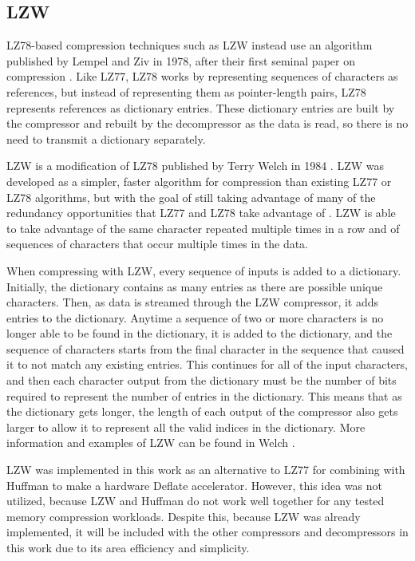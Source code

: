 \documentclass[doublespace,nopageskip]{VTthesis}
\begin{document}
\subsection{LZW}\label{ss:lzw}
LZ78-based compression techniques such as LZW instead use an algorithm published by Lempel and Ziv in 1978, after their first seminal paper on compression \cite{lz78}. Like LZ77, LZ78 works by representing sequences of characters as references, but instead of representing them as pointer-length pairs, LZ78 represents references as dictionary entries. These dictionary entries are built by the compressor and rebuilt by the decompressor as the data is read, so there is no need to transmit a dictionary separately.

LZW is a modification of LZ78 published by Terry Welch in 1984 \cite{lzw}. LZW was developed as a simpler, faster algorithm for compression than existing LZ77 or LZ78 algorithms, but with the goal of still taking advantage of many of the redundancy opportunities that LZ77 and LZ78 take advantage of \cite{lzw}. LZW is able to take advantage of the same character repeated multiple times in a row and of sequences of characters that occur multiple times in the data.

When compressing with LZW, every sequence of inputs is added to a dictionary. Initially, the dictionary contains as many entries as there are possible unique characters. Then, as data is streamed through the LZW compressor, it adds entries to the dictionary. Anytime a sequence of two or more characters is no longer able to be found in the dictionary, it is added to the dictionary, and the sequence of characters starts from the final character in the sequence that caused it to not match any existing entries. This continues for all of the input characters, and then each character output from the dictionary must be the number of bits required to represent the number of entries in the dictionary. This means that as the dictionary gets longer, the length of each output of the compressor also gets larger to allow it to represent all the valid indices in the dictionary. More information and examples of LZW can be found in Welch \cite{lzw}.

LZW was implemented in this work as an alternative to LZ77 for combining with Huffman to make a hardware Deflate accelerator. However, this idea was not utilized, because LZW and Huffman do not work well together for any tested memory compression workloads. Despite this, because LZW was already implemented, it will be included with the other compressors and decompressors in this work due to its area efficiency and simplicity.
\end{document}
